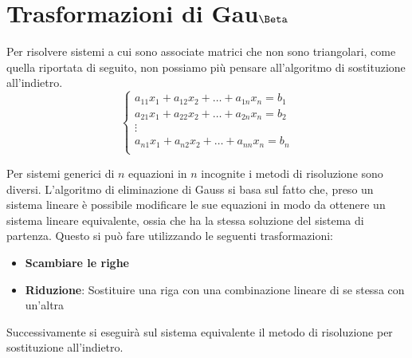 \section{Trasformazioni di Gau$\Beta$}
Per risolvere sistemi a cui sono associate matrici che non sono triangolari,
come quella riportata di seguito, non possiamo più pensare all'algoritmo di
sostituzione all'indietro.
\begin{equation}
    \begin{cases}
        a_{11}x_1 + a_{12} x_2 + \dots + a_{1n} x_n= b_1 \\
        a_{21}x_1 + a_{22} x_2 + \dots + a_{2n} x_n= b_2 \\
        \vdots                                           \\
        a_{n1}x_1 + a_{n2} x_2 + \dots + a_{nn} x_n= b_n \\
    \end{cases}
\end{equation}

Per sistemi generici di $n$ equazioni in $n$ incognite i metodi di risoluzione
sono diversi. L'algoritmo di eliminazione di Gauss si basa sul fatto che, preso
un sistema lineare è possibile modificare le sue equazioni in modo da ottenere
un sistema lineare equivalente, ossia che ha la stessa soluzione del sistema di
partenza. Questo si può fare utilizzando le seguenti trasformazioni:
\begin{itemize}
    \item \textbf{Scambiare le righe}
    \item \textbf{Riduzione}: Sostituire una riga con una combinazione lineare di
          se stessa con un'altra
\end{itemize}
Successivamente si eseguirà sul sistema equivalente il metodo di risoluzione per
sostituzione all'indietro.

